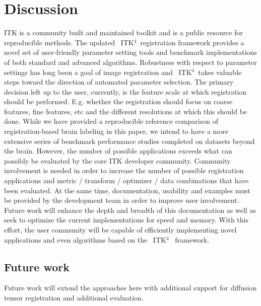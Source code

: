 \documentclass{frontiersSCNS}
\newcommand{\tk}{~ITK$^{\text{4}}$~}
\begin{document}
\section{Discussion} 
ITK is a community built and maintained toolkit and is a public
resource for reproducible methods.  The updated \tk registration
framework provides a novel set of user-friendly parameter setting
tools and benchmark implementations of both standard and advanced
algorithms.  Robustness with respect to parameter settings has long
been a goal of image registration and \tk takes valuable steps toward
the direction of automated parameter selection.  The primary decision
left up to the user, currently, is the feature scale at which
registration should be performed.  E.g. whether the registration should focus on coarse features, fine
features, etc and the different resolutions at which this should be
done.  While we have provided a reproducible reference comparison of
registration-based brain labeling in this paper, we intend to have a more extensive series of benchmark performance studies
completed on datasets beyond the brain.  However, the number of
possible applications exceeds what can possibly be evaluated by the
core ITK developer community.  Community involvement is needed in order to increase the
number of possible registration applications and metric / transform /
optimizer / data combinations that have been evaluated.  At the same
time, documentation, usability and examples must be provided by the
development team in order to improve user involvement.  Future work
will enhance the depth and breadth of this documentation as well as
seek to optimize the current implementations for speed and memory.
With this effort, the user community will be capable of efficiently
implementing novel applications and even algorithms based on the \tk
framework.




\subsection{Future work}
Future work will extend the approaches here with additional support
for diffusion tensor registration and additional evaluation.




\end{document}
